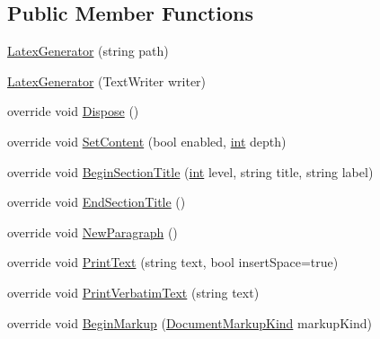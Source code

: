 \subsection*{Public Member Functions}
\begin{DoxyCompactItemize}
\item 
\hyperlink{class_software_engineering_tools_1_1_documentation_1_1_latex_generator_abacc15453eb67bce1b159b43b55b755c}{Latex\+Generator} (string path)
\item 
\hyperlink{class_software_engineering_tools_1_1_documentation_1_1_latex_generator_a993f42bf5ef3a5d1a70abdc180aa8bcf}{Latex\+Generator} (Text\+Writer writer)
\item 
override void \hyperlink{class_software_engineering_tools_1_1_documentation_1_1_latex_generator_a87139c6552aa29fbfdc20e07175ca9b5}{Dispose} ()
\item 
override void \hyperlink{class_software_engineering_tools_1_1_documentation_1_1_latex_generator_ac29ea32798e08c33a486037bfde4ecde}{Set\+Content} (bool enabled, \hyperlink{namespace_software_engineering_tools_1_1_documentation_a4a8017aa254d1d05b03db5132b7dd3a7afa7153f7ed1cb6c0fcf2ffb2fac21748}{int} depth)
\item 
override void \hyperlink{class_software_engineering_tools_1_1_documentation_1_1_latex_generator_a0987b0d6682e4edabf9df277a382eecb}{Begin\+Section\+Title} (\hyperlink{namespace_software_engineering_tools_1_1_documentation_a4a8017aa254d1d05b03db5132b7dd3a7afa7153f7ed1cb6c0fcf2ffb2fac21748}{int} level, string title, string label)
\item 
override void \hyperlink{class_software_engineering_tools_1_1_documentation_1_1_latex_generator_a07c29242cafcbc0a0a0ef817ac818ee1}{End\+Section\+Title} ()
\item 
override void \hyperlink{class_software_engineering_tools_1_1_documentation_1_1_latex_generator_a9633a779ddcb54100666f79e0de6c168}{New\+Paragraph} ()
\item 
override void \hyperlink{class_software_engineering_tools_1_1_documentation_1_1_latex_generator_a0f9a35a1a27283cdb3d521c10439b9c0}{Print\+Text} (string text, bool insert\+Space=true)
\item 
override void \hyperlink{class_software_engineering_tools_1_1_documentation_1_1_latex_generator_a675486162fd632b87673d1533cce276a}{Print\+Verbatim\+Text} (string text)
\item 
override void \hyperlink{class_software_engineering_tools_1_1_documentation_1_1_latex_generator_ad6732108c1739d704defce5722e112ad}{Begin\+Markup} (\hyperlink{namespace_software_engineering_tools_1_1_documentation_a4eed17ca0ed06a8b62b953b063f857d9}{Document\+Markup\+Kind} markup\+Kind)

\end{DoxyCompactItemize}

